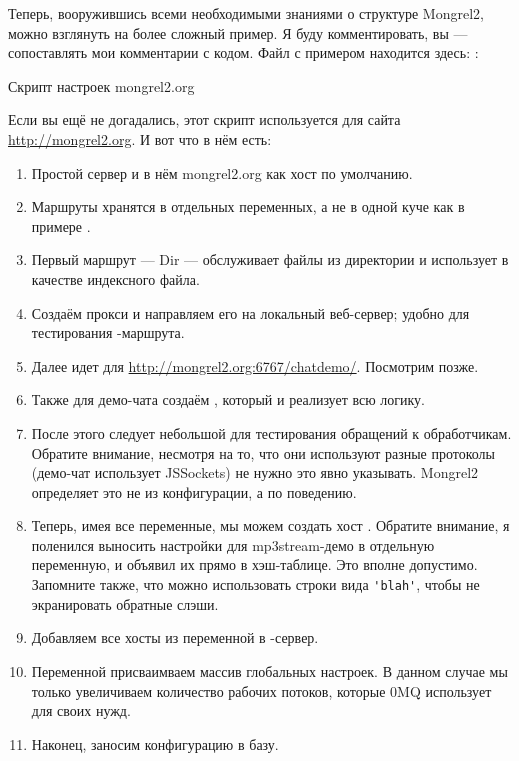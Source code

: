 Теперь, вооружившись всеми необходимыми знаниями о структуре Mongrel2,
можно взглянуть на более сложный пример. Я буду комментировать, вы ---
сопоставлять мои комментарии с кодом.  Файл с примером находится
здесь: :

\begin{code}{Скрипт настроек mongrel2.org}
  
\end{code}

Если вы ещё не догадались, этот скрипт используется для сайта
\url{http://mongrel2.org}. И вот что в нём есть:

\begin{enumerate}
\item Простой сервер и в нём mongrel2.org как хост по умолчанию.
\item Маршруты хранятся в отдельных переменных, а не в одной куче как
    в примере .
\item Первый маршрут --- Dir --- обслуживает файлы из директории
     и использует  в качестве индексного файла.
\item Создаём прокси и направляем его на локальный веб-сервер; удобно
    для тестирования -маршрута.
\item Далее идет  для \url{http://mongrel2.org:6767/chatdemo/}. Посмотрим позже.
\item Также для демо-чата создаём , который и реализует всю логику.
\item После этого следует небольшой  для тестирования
    обращений к обработчикам. Обратите внимание, несмотря на то, что они
    используют разные протоколы (демо-чат использует JSSockets) не нужно
    это явно указывать. Mongrel2 определяет это не из конфигурации, а по
    поведению.
\item Теперь, имея все переменные, мы можем создать хост
. Обратите внимание, я поленился выносить настройки
    для mp3stream-демо в отдельную переменную, и объявил их прямо в хэш-таблице. Это вполне
    допустимо. Запомните также, что можно использовать строки вида
    \verb|'blah'|, чтобы не экранировать обратные слэши.
\item Добавляем все хосты из переменной  в -сервер.
\item Переменной  присваимваем массив глобальных
    настроек. В данном случае мы только увеличиваем количество рабочих
    потоков, которые 0MQ использует для своих нужд.
\item Наконец, заносим конфигурацию в базу.
\end{enumerate}


